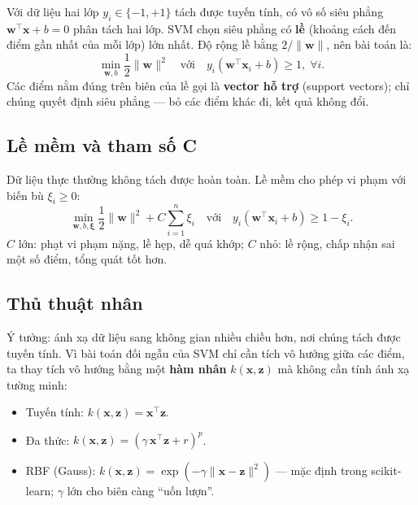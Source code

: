 Với dữ liệu hai lớp $y_i \in \{-1, +1\}$ tách được tuyến tính, có vô số siêu phẳng $\mathbf{w}^\top\mathbf{x} + b = 0$ phân tách hai lớp. SVM chọn siêu phẳng có \textbf{lề} (khoảng cách đến điểm gần nhất của mỗi lớp) lớn nhất. Độ rộng lề bằng $2/\|\mathbf{w}\|$, nên bài toán là:
\begin{equation}
    \min_{\mathbf{w}, b} \frac{1}{2}\|\mathbf{w}\|^2 \quad \text{với} \quad y_i(\mathbf{w}^\top\mathbf{x}_i + b) \geq 1, \;\forall i.
\end{equation}
Các điểm nằm đúng trên biên của lề gọi là \textbf{vector hỗ trợ} (support vectors); chỉ chúng quyết định siêu phẳng --- bỏ các điểm khác đi, kết quả không đổi.

\subsection{Lề mềm và tham số C}

Dữ liệu thực thường không tách được hoàn toàn. Lề mềm cho phép vi phạm với biến bù $\xi_i \geq 0$:
\begin{equation}
    \min_{\mathbf{w}, b, \boldsymbol{\xi}} \frac{1}{2}\|\mathbf{w}\|^2 + C\sum_{i=1}^{n}\xi_i \quad \text{với} \quad y_i(\mathbf{w}^\top\mathbf{x}_i + b) \geq 1 - \xi_i .
\end{equation}
$C$ lớn: phạt vi phạm nặng, lề hẹp, dễ quá khớp; $C$ nhỏ: lề rộng, chấp nhận sai một số điểm, tổng quát tốt hơn.

\subsection{Thủ thuật nhân}

Ý tưởng: ánh xạ dữ liệu sang không gian nhiều chiều hơn, nơi chúng tách được tuyến tính. Vì bài toán đối ngẫu của SVM chỉ cần tích vô hướng giữa các điểm, ta thay tích vô hướng bằng một \textbf{hàm nhân} $k(\mathbf{x}, \mathbf{z})$ mà không cần tính ánh xạ tường minh:
\begin{itemize}
    \item Tuyến tính: $k(\mathbf{x}, \mathbf{z}) = \mathbf{x}^\top\mathbf{z}$.
    \item Đa thức: $k(\mathbf{x}, \mathbf{z}) = (\gamma\,\mathbf{x}^\top\mathbf{z} + r)^p$.
    \item RBF (Gauss): $k(\mathbf{x}, \mathbf{z}) = \exp(-\gamma\|\mathbf{x} - \mathbf{z}\|^2)$ --- mặc định trong scikit-learn; $\gamma$ lớn cho biên càng ``uốn lượn''.
\end{itemize}

